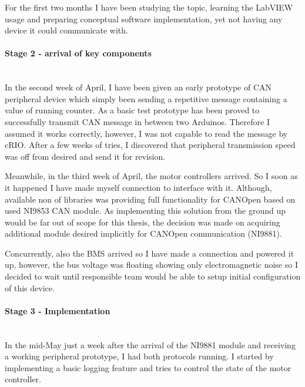 For the first two months I have been studying the topic, learning the LabVIEW usage and preparing conceptual software implementation, yet not having any device it could communicate with.

\paragraph{Stage 2 - arrival of key components}\mbox{}\\
In the second week of April, I have been given an early prototype of CAN peripheral device which simply been sending a repetitive message containing a value of running counter. As a basic test prototype has been proved to successfully transmit CAN message in between two Arduinos. Therefore I assumed it works correctly, however, I was not capable to read the message by cRIO. After a few weeks of tries, I discovered that peripheral transmission speed was off from desired and send it for revision.

Meanwhile, in the third week of April, the motor controllers arrived. So I soon as it happened I have made myself connection to interface with it. Although, available non of libraries was providing full functionality for CANOpen based on used NI9853 CAN module. As implementing this solution from the ground up would be far out of scope for this thesis, the decision was made on acquiring additional module desired implicitly for CANOpen communication (NI9881).

Concurrently, also the BMS arrived so I have made a connection and powered it up, however, the bus voltage was floating showing only electromagnetic noise so I decided to wait until responsible team would be able to setup initial configuration of this device.

\paragraph{Stage 3 - Implementation}\mbox{}\\
In the mid-May just a week after the arrival of the NI9881 module and receiving a working peripheral prototype, I had both protocols running. I started by implementing a basic logging feature and tries to control the state of the motor controller. 

